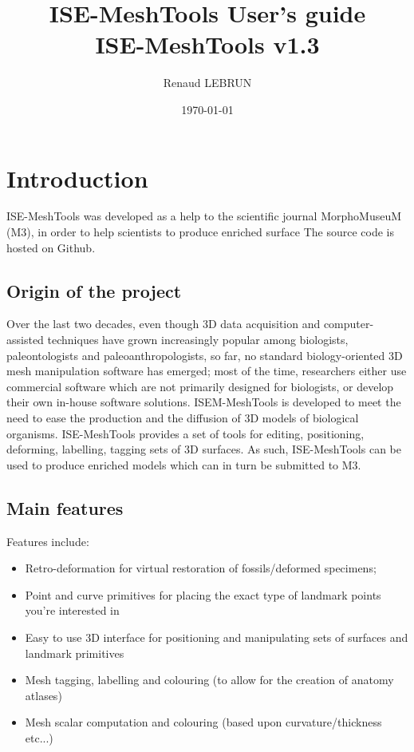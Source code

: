 \documentclass[12pt, a4paper]{book}
\title{ISE-MeshTools User's guide\\ISE-MeshTools v1.3}
\author{Renaud LEBRUN}
\affil{Institut des Sciences de l'Evolution, University of Montpellier, France}
\date{\today}
\begin{document}
	\dominitoc

\maketitle
 

\tableofcontents

\chapter*{Introduction}
 ISE-MeshTools \citep{Lebrun2014} was developed  as a help to the scientific journal MorphoMuseuM (M3), in order to help scientists to produce enriched surface The source code is hosted on Github. 
\section {Origin of the project }
Over the last two decades, even though 3D data acquisition and computer-assisted techniques have grown increasingly popular among biologists, paleontologists and paleoanthropologists, so far, no standard biology-oriented 3D mesh manipulation software has emerged; most of the time, researchers either use commercial software which are not primarily designed for biologists, or develop their own in-house software solutions. ISEM-MeshTools is developed to meet the need to ease the production and the diffusion of 3D models of biological organisms. ISE-MeshTools provides a set of tools for editing, positioning, deforming, labelling, tagging sets of 3D surfaces. As such, ISE-MeshTools can be used to produce enriched models which can in turn be submitted to M3.
\section {Main features}
Features include:
\begin{itemize}
\item Retro-deformation for virtual restoration of fossils/deformed specimens;
\item Point and curve primitives for placing the exact type of landmark points you’re interested in
\item Easy to use 3D interface for positioning and manipulating sets of surfaces and landmark primitives
\item Mesh tagging, labelling and colouring (to allow for the creation of anatomy atlases)
\item Mesh scalar computation and colouring (based upon curvature/thickness etc...)
\end{itemize}
\end{document}
